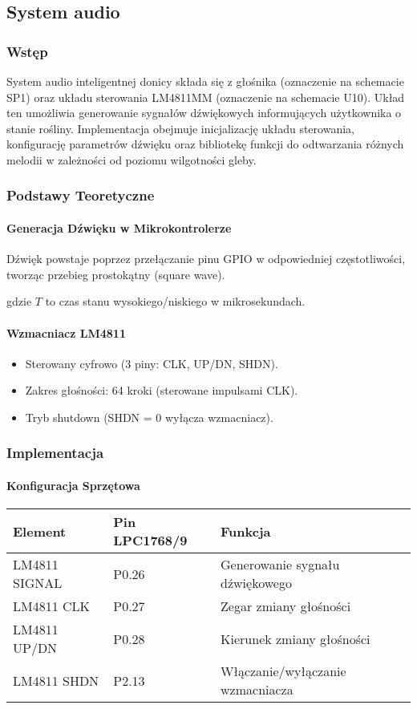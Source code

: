 \subsection{System audio}

\subsubsection{Wstęp}
System audio inteligentnej donicy składa się z głośnika (oznaczenie na schemacie SP1) oraz układu sterowania LM4811MM (oznaczenie na schemacie U10). Układ ten umożliwia generowanie sygnałów dźwiękowych informujących użytkownika o stanie rośliny. Implementacja obejmuje inicjalizację układu sterowania, konfigurację parametrów dźwięku oraz bibliotekę funkcji do odtwarzania różnych melodii w zależności od poziomu wilgotności gleby.


\subsubsection{Podstawy Teoretyczne}
\paragraph{Generacja Dźwięku w Mikrokontrolerze}
Dźwięk powstaje poprzez przełączanie pinu GPIO w odpowiedniej częstotliwości, tworząc przebieg prostokątny (square wave).

gdzie $T$ to czas stanu wysokiego/niskiego w mikrosekundach.

\paragraph{Wzmacniacz LM4811}
\begin{itemize}
    \item Sterowany cyfrowo (3 piny: CLK, UP/DN, SHDN).
    \item Zakres głośności: 64 kroki (sterowane impulsami CLK).
    \item Tryb shutdown (SHDN = 0 wyłącza wzmacniacz).
\end{itemize}

\subsubsection{Implementacja}
\paragraph{Konfiguracja Sprzętowa}
\begin{tabular}{|l|l|l|}
\hline
\textbf{Element} & \textbf{Pin LPC1768/9} & \textbf{Funkcja} \\
\hline
LM4811 SIGNAL& P0.26 & Generowanie sygnału dźwiękowego \\
LM4811 CLK & P0.27 & Zegar zmiany głośności \\
LM4811 UP/DN & P0.28 & Kierunek zmiany głośności \\
LM4811 SHDN & P2.13 & Włączanie/wyłączanie wzmacniacza \\
\hline
\end{tabular}

